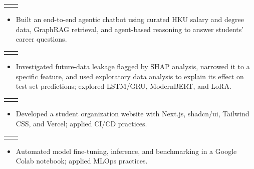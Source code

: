 \documentclass[a4paper,10pt]{article}
\makeatletter
\newcommand{\icononlylink}[2]{
  \href{#2}{#1}
}
\newcommand{\resumeItem}[1]{
  \item\small{#1}
}
\newcommand{\resumeProjectHeading}[2]{
  \vspace{-2pt}\item
    \begin{tabular*}{0.97\textwidth}[t]{@{}l@{\extracolsep{\fill}}r@{}}
      \textlight{\small#1} & \textlight{\small#2} \\
    \end{tabular*}\vspace{-7pt}
}
\newcommand{\resumeItemListStart}{
  \begin{itemize}[
    leftmargin=0.2in,
    rightmargin=0.2in,
    itemindent=0pt,
    labelsep=0.1in,
    itemsep=1pt,
    parsep=0pt,
    topsep=3pt,
    label={\raisebox{2pt}{\tiny$\bullet$}}
  ]
}
\newcommand{\resumeItemListEnd}{\end{itemize}}
\makeatother
\begin{document}
    \resumeProjectHeading
      {\textbf{HKU Graduate Employment Survey RAG Agentic Chatbot (Group Project)}}
      {Apr 2026 -- May 2026}
      \resumeItemListStart
        \resumeItem{Built an end-to-end agentic chatbot using curated HKU salary and degree data, GraphRAG retrieval, and agent-based reasoning to answer students' career questions.}
      \resumeItemListEnd

    \resumeProjectHeading
      {\textbf{30-Day All-Cause Hospital Readmission Prediction with MIMIC-IV (Group Project)}}
      {Oct 2025 -- Dec 2025}
      \resumeItemListStart
        \resumeItem{Investigated future-data leakage flagged by SHAP analysis, narrowed it to a specific feature, and used exploratory data analysis to explain its effect on test-set predictions; explored LSTM/GRU, ModernBERT, and LoRA.}
      \resumeItemListEnd

    \resumeProjectHeading
      {\textbf{alphahku.vercel.app}}%
      {Jul 2025 -- Aug 2025}
      \resumeItemListStart
        \resumeItem{Developed a student organization website with Next.js, shadcn/ui, Tailwind CSS, and Vercel; applied CI/CD practices.}
      \resumeItemListEnd

    \resumeProjectHeading
      {\textbf{Reproducing RealFill (SIGGRAPH 2024)}}%
      {Mar 2025 -- May 2025}
      \resumeItemListStart
        \resumeItem{Automated model fine-tuning, inference, and benchmarking in a Google Colab notebook; applied MLOps practices.}
      \resumeItemListEnd
\end{document}
